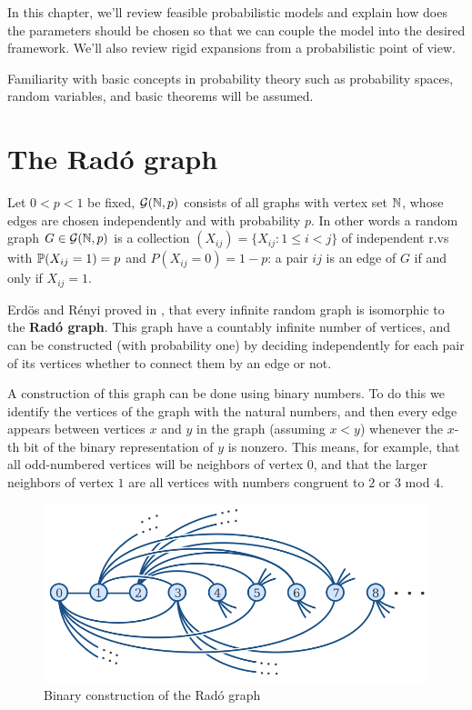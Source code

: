 In this chapter, we'll review feasible probabilistic models and explain how does the parameters should be chosen so that we can couple the model into the desired framework. We'll also review rigid expansions from a probabilistic point of view.

Familiarity with basic concepts in probability theory such as probability spaces, random variables, and basic theorems will be assumed.

\section{The Radó graph}

Let $0 < p < 1$ be fixed, $\G(\N, p)$ consists of all graphs with vertex set $\N$, whose edges are chosen independently and with probability $p$. In other words a random graph $G \in \G(\N,p)$ is a collection $(X_{ij}) = \{ X_{ij} : 1 \leq i < j\}$ of independent r.vs with $\P(X_{ij} = 1) = p$ and $P(X_{ij} = 0) = 1-p$: a pair $ij$ is an edge of $G$ if and only if $X_{ij} = 1$.

Erdös and Rényi proved in \cite[Erdös, Rényi]{RadoUnique}, that every infinite random graph is isomorphic to the \textbf{Radó graph}. This graph have a countably infinite number of vertices, and can be constructed (with probability one) by deciding independently for each pair of its vertices whether to connect them by an edge or not.

A construction of this graph can be done using binary numbers. To do this we identify the vertices of the graph with the natural numbers, and then every edge appears between vertices $x$ and $y$ in the graph (assuming $x < y$) whenever the $x$-th bit of the binary representation of $y$ is nonzero. This means, for example, that all odd-numbered vertices will be neighbors of vertex $0$, and that the larger neighbors of vertex $1$ are all vertices with numbers congruent to $2$ or $3$ mod $4$.

\begin{figure}[h!]
	\centering
	\includegraphics[scale=0.7]{Figures/Rado-graph.png}
	\caption{Binary construction of the Radó graph}
\end{figure}

